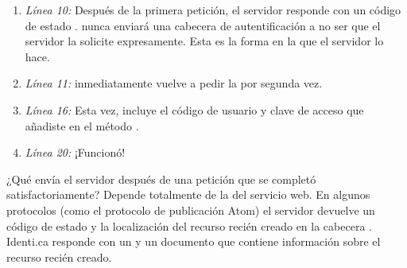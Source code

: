 \begin{enumerate}

\item \emph{Línea 10:} Después de la primera petición, el servidor responde con un código de estado .  nunca enviará una cabecera de autentificación a no ser que el servidor la solicite expresamente. Esta es la forma en la que el servidor lo hace.

\item \emph{Línea 11:}  inmediatamente vuelve a pedir la  por segunda vez.

\item \emph{Línea 16:} Esta vez, incluye el código de usuario y clave de acceso que añadiste en el método .

\item \emph{Línea 20:} ¡Funcionó!

\end{enumerate}

¿Qué envía el servidor después de una petición que se completó satisfactoriamente? Depende totalmente de la  del servicio web. En algunos protocolos (como el protocolo de publicación Atom) el servidor devuelve un código de estado  y la localización del recurso recién creado en la cabecera . Identi.ca responde con un  y un documento  que contiene información sobre el recurso recién creado.

